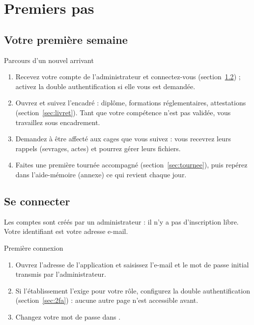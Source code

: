 \documentclass[11pt,a4paper]{article}
\begin{document}
\section{Premiers pas}\label{sec:premiers}

\subsection{Votre première semaine}
\begin{procedure}{Parcours d'un nouvel arrivant}
\begin{enumerate}
  \item Recevez votre compte de l'administrateur et connectez-vous
    (section~\ref{sec:connexion}) ; activez la double authentification si
    elle vous est demandée.
  \item Ouvrez  et suivez
    l'encadré  : diplôme, formations
    réglementaires, attestations (section~\ref{sec:livret}). Tant que votre
    compétence n'est pas validée, vous travaillez sous encadrement.
  \item Demandez à être affecté aux cages que vous suivez : vous recevrez
    leurs rappels (sevrages, actes) et pourrez gérer leurs fichiers.
  \item Faites une première tournée accompagné (section~\ref{sec:tournee}),
    puis repérez dans l'aide-mémoire (annexe) ce qui revient chaque jour.
\end{enumerate}
\end{procedure}

\subsection{Se connecter}\label{sec:connexion}
Les comptes sont créés par un administrateur : il n'y a pas d'inscription
libre. Votre identifiant est votre adresse e-mail.

\begin{procedure}{Première connexion}
\begin{enumerate}
  \item Ouvrez l'adresse de l'application et saisissez l'e-mail et le mot de
    passe initial transmis par l'administrateur.
  \item Si l'établissement l'exige pour votre rôle, configurez la double
    authentification (section~\ref{sec:2fa}) : aucune autre page n'est
    accessible avant.
  \item Changez votre mot de passe dans .
\end{enumerate}
\end{procedure}
\end{document}
